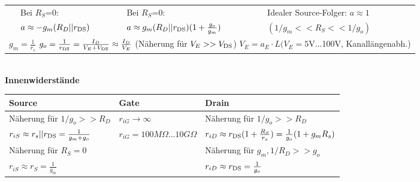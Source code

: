 \begin{tabular}{|l|l|l|l|}
                    & Bei $R_S$=0:                 & Bei $R_S$=0:                   & Idealer Source-Folger: $a\approx1$ \\
                    & $a\approx -g_m(R_D||r_{\rm DS})$  & $a\approx g_m(R_D||r_{\rm DS})(1+\frac{g_o}{g_m})$       & $(1/g_m<<R_S<<1/g_o)$ \\
    \hline
    \multicolumn{4}{|l|}{$g_m = \frac{1}{r_s}$ \hspace{15pt} $g_o = \frac{1}{r_{\rm DS}}= \frac{I_D}{V_E+V_{\rm DS}}\approx\frac{I_D}{V_E}$ (Näherung für $V_E>>V_{\rm DS}$) \hspace{10pt} $V_E = a_E\cdot L (V_E=5$V...100V, Kanallängenabh.)} \\
    \hline
\end{tabular}\vspace{5pt}\\
\textbf{Innenwiderstände}\\
\renewcommand{\arraystretch}{1}
\begin{tabular}{|l|l|l|}
    \hline
    \textbf{Source}                 & \textbf{Gate}                     &\textbf{Drain} \\
    \hline
    Näherung für $1/g_o>>R_D$       & $r_{iG}\rightarrow\infty$     & Näherung für $1/g_o>>R_D$ \\
    $r_{iS}\approx r_s||r_{\rm DS}=\frac{1}{g_m+g_o}$       &  $r_{iG}=100M\Omega ...10 G\Omega$     & $r_{iD}\approx r_{\rm DS}(1+\frac{R_S}{r_s})=\frac{1}{g_o}(1+g_mR_s)$ \\
    Näherung für $R_S = 0$                              &           & Näherung für $g_m, 1/R_D>>g_o$ \\
    $r_{iS}\approx r_S = \frac{1}{g_m}$                 &           & $r_{iD}\approx r_{\rm DS} = \frac{1}{g_o}$ \\
    \hline
\end{tabular}
